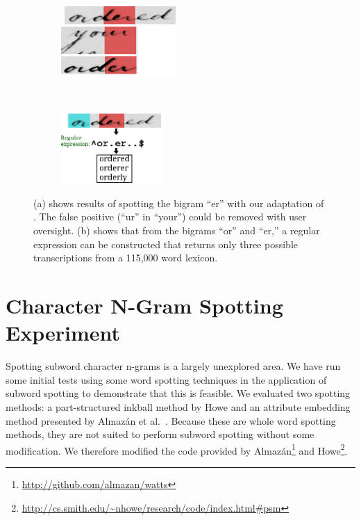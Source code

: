 \documentclass[conference]{IEEEtran}
\begin{document}
\begin{figure}
    \centering
    \begin{subfigure}[t]{0.23\textwidth}
    		\centering
    		\includegraphics[height=2.7cm]{er}
    		\caption{}%
    		\label{fig:spotting_ex}
    	\end{subfigure}
    	~
    	\begin{subfigure}[t]{0.23\textwidth}
    		\centering
    		\includegraphics[height=2.7cm]{regex}
    		\caption{}%
    		\label{fig:list}
    	\end{subfigure}
    	\caption{(a) shows results of spotting the bigram ``er'' with our adaptation of \cite{Almazan2014}. The false positive (``ur'' in ``your'') could be removed with user oversight. (b) shows that from the bigrams ``or'' and ``er,'' a regular expression can be constructed that returns only three possible transcriptions from a 115,000 word lexicon.}
    	\label{fig:spotting}
\end{figure}

\section{Character N-Gram Spotting Experiment}
Spotting subword character n-grams is a largely unexplored area. We have run some initial tests using some word spotting techniques in the application of subword spotting to demonstrate that this is feasible. We evaluated two spotting methods: a part-structured inkball method by Howe \cite{Howe2013} and an attribute embedding method presented by Almaz\'{a}n et al.~\cite{Almazan2014}. Because these are whole word spotting methods, they are not suited to perform subword spotting without some modification. We therefore modified the code provided by Almaz\'{a}n\footnote{\url{http://github.com/almazan/watts}} and Howe\footnote{\url{http://cs.smith.edu/~nhowe/research/code/index.html#psm}}.
\end{document}
